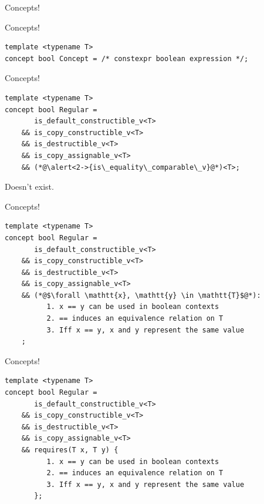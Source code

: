 \documentclass[aspectratio=169]{beamer}
\begin{document}

\begin{frame}[standout]
  Concepts!
\end{frame}


\begin{frame}[fragile]{Concepts!}
\begin{lstlisting}
template <typename T>
concept bool Concept = /* constexpr boolean expression */;
\end{lstlisting}
\end{frame}


\begin{frame}[fragile]{Concepts!}
\begin{lstlisting}
template <typename T>
concept bool Regular =
       is_default_constructible_v<T>
    && is_copy_constructible_v<T>
    && is_destructible_v<T>
    && is_copy_assignable_v<T>
    && (*@\alert<2->{is\_equality\_comparable\_v}@*)<T>;
\end{lstlisting}
  \pause{}
  \pause{}
  \begin{center}
    \Large Doesn't exist.
  \end{center}
\end{frame}


\begin{frame}[fragile]{Concepts!}
\begin{lstlisting}
template <typename T>
concept bool Regular =
       is_default_constructible_v<T>
    && is_copy_constructible_v<T>
    && is_destructible_v<T>
    && is_copy_assignable_v<T>
    && (*@$\forall \mathtt{x}, \mathtt{y} \in \mathtt{T}$@*):
          1. x == y can be used in boolean contexts
          2. == induces an equivalence relation on T
          3. Iff x == y, x and y represent the same value
    ;
\end{lstlisting}
\end{frame}


\begin{frame}[fragile]{Concepts!}
\begin{lstlisting}
template <typename T>
concept bool Regular =
       is_default_constructible_v<T>
    && is_copy_constructible_v<T>
    && is_destructible_v<T>
    && is_copy_assignable_v<T>
    && requires(T x, T y) {
          1. x == y can be used in boolean contexts
          2. == induces an equivalence relation on T
          3. Iff x == y, x and y represent the same value
       };
\end{lstlisting}
\end{frame}
\end{document}
